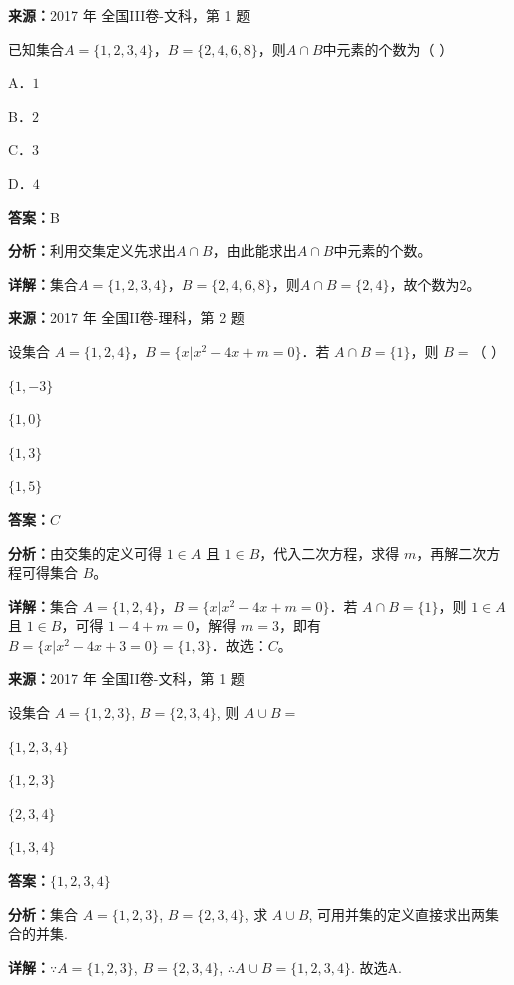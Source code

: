 \begin{question}[points=5]
\textbf{来源：}2017 年 全国III卷-文科，第 1 题\par
已知集合$A=\{1,2,3,4\}$，$B=\{2,4,6,8\}$，则$A\cap B$中元素的个数为（    ）
\begin{choices}
  \item A．$1$
  \item B．$2$
  \item C．$3$
  \item D．$4$
\end{choices}
\begin{solution}
\textbf{答案：}B

\textbf{分析：}利用交集定义先求出$A\cap B$，由此能求出$A\cap B$中元素的个数。

\textbf{详解：}集合$A=\{1,2,3,4\}$，$B=\{2,4,6,8\}$，则$A\cap B=\{2,4\}$，故个数为$2$。
\end{solution}
\end{question}

\begin{question}[points=5]
\textbf{来源：}2017 年 全国II卷-理科，第 2 题\par
设集合 $A=\{1,2,4\}$，$B=\{x|x^2-4x+m=0\}$．若 $A\cap B=\{1\}$，则 $B=$（   ）
\begin{choices}
  \item $\{1,-3\}$
  \item $\{1,0\}$
  \item $\{1,3\}$
  \item $\{1,5\}$
\end{choices}
\begin{solution}
\textbf{答案：}$C$

\textbf{分析：}由交集的定义可得 $1\in A$ 且 $1\in B$，代入二次方程，求得 $m$，再解二次方程可得集合 $B$。

\textbf{详解：}集合 $A=\{1,2,4\}$，$B=\{x|x^2-4x+m=0\}$．若 $A\cap B=\{1\}$，则 $1\in A$ 且 $1\in B$，可得 $1-4+m=0$，解得 $m=3$，即有 $B=\{x|x^2-4x+3=0\}=\{1,3\}$．故选：$C$。
\end{solution}
\end{question}

\begin{question}[points=5]
\textbf{来源：}2017 年 全国II卷-文科，第 1 题\par
设集合 $A=\{1,2,3\}$, $B=\{2,3,4\}$, 则 $A\cup B=$
\begin{choices}
  \item $\{1,2,3,4\}$
  \item $\{1,2,3\}$
  \item $\{2,3,4\}$
  \item $\{1,3,4\}$
\end{choices}
\begin{solution}
\textbf{答案：}$\{1,2,3,4\}$

\textbf{分析：}集合 $A=\{1,2,3\}$, $B=\{2,3,4\}$, 求 $A\cup B$, 可用并集的定义直接求出两集合的并集.

\textbf{详解：}$\because A=\{1,2,3\}$, $B=\{2,3,4\}$, $\therefore A\cup B=\{1,2,3,4\}$. 故选A.
\end{solution}
\end{question}

